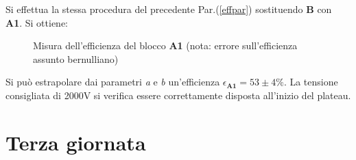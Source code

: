 \documentclass[12pt,a4paper,openright,twoside]{article}
\numberwithin{equation}{section} %
\begin{document}
Si effettua la stessa procedura del precedente Par.(\ref{effpar}) sostituendo  \textbf{B} con \textbf{A1}. Si ottiene:

\begin{figure}[htbp]
\begin{center}
\caption{Misura dell'efficienza del blocco \textbf{A1} (nota: errore sull'efficienza assunto bernulliano) \label{grafeff}}
\end{center}
\end{figure}

Si può estrapolare dai parametri \textit{a} e \textit{b} un'efficienza $\epsilon_{\mathbf{A1}}=53 \pm 4 \%$. La tensione consigliata di 2000V si verifica essere correttamente disposta all'inizio del plateau.

\pagebreak
\section{Terza giornata}
\end{document}
